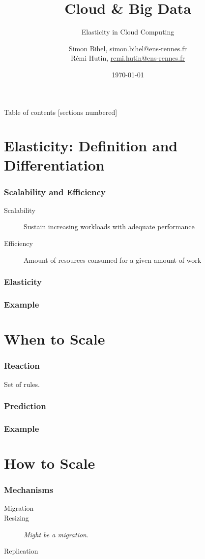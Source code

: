 \documentclass{beamer}
\title{Cloud \& Big Data}
\subtitle{Elasticity in Cloud Computing}
\date{\today}
\author{%
  Simon Bihel, \url{simon.bihel@ens-rennes.fr} \\
  Rémi Hutin, \url{remi.hutin@ens-rennes.fr}
}
\institute{%
  University of Rennes I \\
  École normale supérieure de Rennes
}
\begin{document}
\maketitle

\begin{frame}{Table of contents}
  [sections numbered]
  \tableofcontents[hideallsubsections]
\end{frame}


\section{Elasticity: Definition and Differentiation}
\begin{frame}
  \frametitle{Scalability and Efficiency~\cite{herbst2013elasticity}}
  \begin{description}
    \item[Scalability] Sustain increasing workloads with adequate performance
    \item[Efficiency] Amount of resources consumed for a given amount of work
  \end{description}
\end{frame}

\begin{frame}
  \frametitle{Elasticity~\cite{herbst2013elasticity}~\cite{galante2012survey}~\cite{gulati2011cloud}~\cite{sharma2011cost}~\cite{moore2013coordinated}}
  \begin{definition}
  \end{definition}
\end{frame}

\begin{frame}
  \frametitle{Example}
\end{frame}


\section{When to Scale}
\begin{frame}
  \frametitle{Reaction}
  Set of rules.
\end{frame}

\begin{frame}
  \frametitle{Prediction}
\end{frame}

\begin{frame}
  \frametitle{Example}
\end{frame}


\section{How to Scale}
\begin{frame}
  \frametitle{Mechanisms}
  \begin{description}
    \item[Migration]
    \item[Resizing] \textit{Might be a migration.}
    \item[Replication]
  \end{description}
\end{frame}
\end{document}
